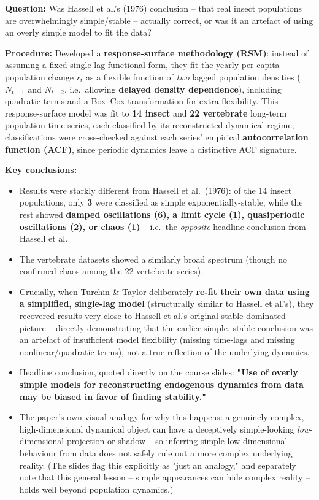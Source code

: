 \documentclass[11pt,a4paper]{article}
\begin{document}
\begin{papbox}[title={Paper Summary: Turchin \& Taylor (1992), \textit{Ecology} 73(1):289--305 -- ``Complex Dynamics in Ecological Time Series''}]
\textbf{Question:} Was Hassell et al.'s (1976) conclusion -- that real insect populations are overwhelmingly simple/stable -- actually correct, or was it an artefact of using an overly simple model to fit the data?

\textbf{Procedure:} Developed a \textbf{response-surface methodology (RSM)}: instead of assuming a fixed single-lag functional form, they fit the yearly per-capita population change $r_t$ as a flexible function of \emph{two} lagged population densities ($N_{t-1}$ and $N_{t-2}$, i.e.\ allowing \textbf{delayed density dependence}), including quadratic terms and a Box--Cox transformation for extra flexibility. This response-surface model was fit to \textbf{14 insect} and \textbf{22 vertebrate} long-term population time series, each classified by its reconstructed dynamical regime; classifications were cross-checked against each series' empirical \textbf{autocorrelation function (ACF)}, since periodic dynamics leave a distinctive ACF signature.

\textbf{Key conclusions:}
\begin{itemize}[leftmargin=1.3em,nosep]
\item Results were starkly different from Hassell et al.\ (1976): of the 14 insect populations, only \textbf{3} were classified as simple exponentially-stable, while the rest showed \textbf{damped oscillations (6), a limit cycle (1), quasiperiodic oscillations (2), or chaos (1)} -- i.e.\ the \emph{opposite} headline conclusion from Hassell et al.
\item The vertebrate datasets showed a similarly broad spectrum (though no confirmed chaos among the 22 vertebrate series).
\item Crucially, when Turchin \& Taylor deliberately \textbf{re-fit their own data using a simplified, single-lag model} (structurally similar to Hassell et al.'s), they recovered results very close to Hassell et al.'s original stable-dominated picture -- directly demonstrating that the earlier simple, stable conclusion was an artefact of insufficient model flexibility (missing time-lags and missing nonlinear/quadratic terms), not a true reflection of the underlying dynamics.
\item Headline conclusion, quoted directly on the course slides: \textbf{"Use of overly simple models for reconstructing endogenous dynamics from data may be biased in favor of finding stability."}
\item The paper's own visual analogy for why this happens: a genuinely complex, high-dimensional dynamical object can have a deceptively simple-looking \emph{low}-dimensional projection or shadow -- so inferring simple low-dimensional behaviour from data does not safely rule out a more complex underlying reality. (The slides flag this explicitly as "just an analogy," and separately note that this general lesson -- simple appearances can hide complex reality -- holds well beyond population dynamics.)
\end{itemize}
\end{papbox}
\end{document}
